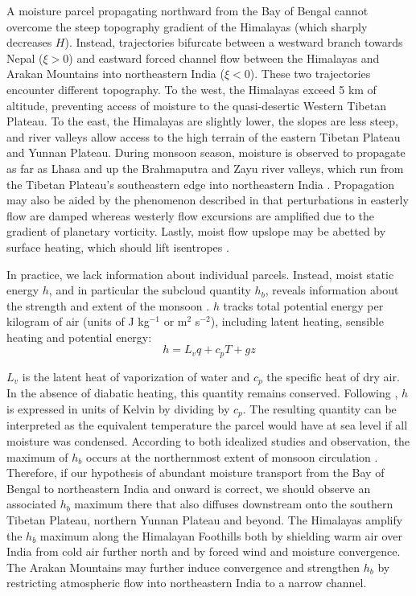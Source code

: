 	A moisture parcel propagating northward from the Bay of Bengal cannot overcome the steep topography gradient of the Himalayas (which sharply decreases $H$). Instead, trajectories bifurcate between a westward branch towards Nepal ($\xi > 0$) and eastward forced channel flow between the Himalayas and Arakan Mountains into northeastern India ($\xi < 0$). These two trajectories encounter different topography. To the west, the Himalayas exceed 5 km of altitude, preventing access of moisture to the quasi-desertic Western Tibetan Plateau. To the east, the Himalayas are slightly lower, the slopes are less steep, and river valleys allow access to the high terrain of the eastern Tibetan Plateau and Yunnan Plateau. During monsoon season, moisture is observed to propagate as far as Lhasa and up the Brahmaputra and Zayu river valleys, which run from the Tibetan Plateau's southeastern edge into northeastern India \citep{Gao2011,Yang2011}. Propagation may also be aided by the phenomenon described in \cite{Holton2004} that perturbations in easterly flow are damped whereas westerly flow excursions are amplified due to the gradient of planetary vorticity. Lastly, moist flow upslope may be abetted by surface heating, which should lift isentropes \citep{Molnar1999,Prive2007a}. 
	
	In practice, we lack information about individual parcels. Instead, moist static energy $h$, and in particular the subcloud quantity $h_b$, reveals information about the strength and extent of the monsoon \citep{Prive2007,Prive2007a}. $h$ tracks total potential energy per kilogram of air (units of J kg$^{-1}$ or m$^2$ s$^{-2}$), including latent heating, sensible heating and potential energy:
	\begin{displaymath}
			h= L_v q+c_p T+gz
	\end{displaymath}
		
	$L_v$ is the latent heat of vaporization of water and $c_p$ the specific heat of dry air. In the absence of diabatic heating, this quantity remains conserved. Following \cite{Boos2010}, $h$ is expressed in units of Kelvin by dividing by $c_p$. The resulting quantity can be interpreted as the equivalent temperature the parcel would have at sea level if all moisture was condensed. According to both idealized studies and observation, the maximum of $h_b$ occurs at the northernmost extent of monsoon circulation  \citep{Emanuel1995,Prive2007,Boos2010,Nie2010}. Therefore, if our hypothesis of abundant moisture transport from the Bay of Bengal to northeastern India and onward is correct, we should observe an associated $h_b$ maximum there that also diffuses downstream onto the southern Tibetan Plateau, northern Yunnan Plateau and beyond. The Himalayas amplify the $h_b$ maximum along the Himalayan Foothills both by shielding warm air over India from cold air further north \citep{Boos2010} and by forced wind and moisture convergence. The Arakan Mountains may further induce convergence and strengthen $h_b$ by restricting atmospheric flow into northeastern India to a narrow channel.

